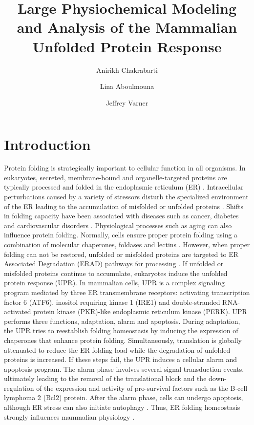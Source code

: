 \documentclass[fleqn,10pt]{wlscirep}
\title{Large Physiochemical Modeling and Analysis of the Mammalian Unfolded Protein Response}
\author[1]{Anirikh Chakrabarti}
\author[2]{Lina Aboulmouna}
\author[1,2,*]{Jeffrey Varner}
\affil[1]{Cornell University, School of Chemical and Biomolecular Engineering, Cornell University, Ithaca, NY 14853, USA}
\affil[2]{Purdue University, School of Chemical Engineering, West Lafayette, IN 47907, USA}
\affil[*]{jdv27@cornell.edu}
\begin{document}
\flushbottom
\maketitle

%
%
\thispagestyle{empty}



\section*{Introduction}

Protein folding is strategically important to cellular function in all organisms. In eukaryotes, secreted, membrane-bound and organelle-targeted proteins are typically processed and folded in the endoplasmic reticulum (ER) \cite{naidoo2009er, ron2002translational, kaufman2002unfolded}. Intracellular perturbations caused by a variety of stressors disturb the specialized environment of the ER leading to the accumulation of misfolded or unfolded proteins \cite{ellgaard2003qce,Fonseca:2009fk}. Shifts in folding capacity have been associated with diseases such as cancer, diabetes and cardiovascular disorders \cite{ellgaard2003qce}. Physiological processes such as aging can also influence protein folding. Normally, cells ensure proper protein folding using a combination of molecular chaperones, foldases and lectins \cite{naidoo2009er}. However, when proper folding can not be restored, unfolded or misfolded proteins are targeted to ER Associated Degradation (ERAD) pathways for processing \cite{kaufman2002unfolded}. If unfolded or misfolded proteins continue to accumulate, eukaryotes induce the unfolded protein response (UPR). In mammalian cells, UPR is a complex signaling program mediated by three ER transmembrane receptors: activating transcription factor 6 (ATF6), inositol requiring kinase 1 (IRE1) and double-stranded RNA-activated protein kinase (PKR)-like endoplasmic reticulum kinase (PERK). UPR performs three functions, adaptation, alarm and apoptosis. During adaptation, the UPR tries to reestablish folding homeostasis by inducing the expression of chaperones that enhance protein folding. Simultaneously, translation is globally attenuated to reduce the ER folding load while the degradation of unfolded proteins is increased. If these steps fail, the UPR induces a cellular alarm and apoptosis program. The alarm phase involves several signal transduction events, ultimately leading to the removal of the translational block and the down-regulation of the expression and activity of pro-survival factors such as the B-cell lymphoma 2 (Bcl2) protein. After the alarm phase, cells can undergo apoptosis, although ER stress can also initiate autophagy \cite{ogata2006aac, yorimitsu2006ers, bernales2006ace, kamimoto2006iic, hoyerhansen2007cmc, kouroku2006esp, fujita2007ter}. Thus, ER folding homeostasis strongly influences mammalian physiology \cite{Fonseca:2009fk}.
\end{document}
